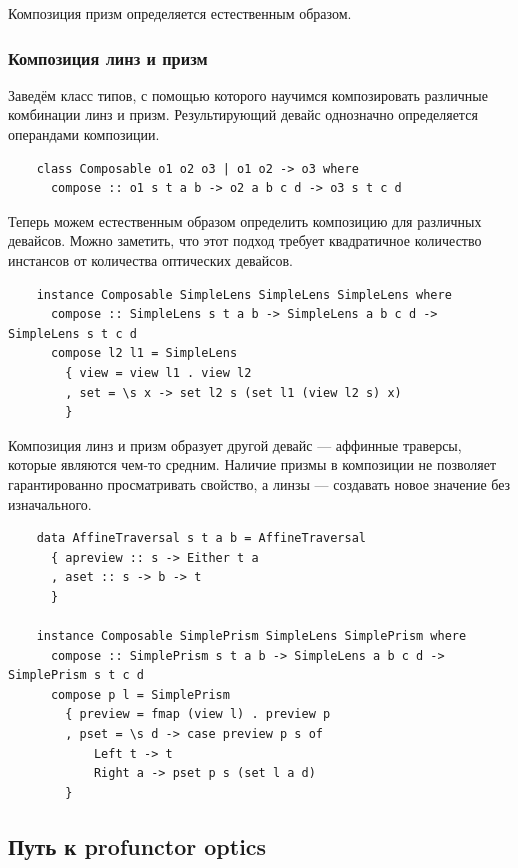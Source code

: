 Композиция призм определяется естественным образом.


\subsubsection{Композиция линз и призм}

Заведём класс типов, с помощью которого научимся композировать различные комбинации линз и призм.
Результирующий девайс однозначно определяется операндами композиции.

\begin{verbatim}
    class Composable o1 o2 o3 | o1 o2 -> o3 where
      compose :: o1 s t a b -> o2 a b c d -> o3 s t c d
\end{verbatim}

Теперь можем естественным образом определить композицию для различных девайсов.
Можно заметить, что этот подход требует квадратичное количество инстансов от количества оптических девайсов.

\begin{verbatim}
    instance Composable SimpleLens SimpleLens SimpleLens where
      compose :: SimpleLens s t a b -> SimpleLens a b c d -> SimpleLens s t c d
      compose l2 l1 = SimpleLens
        { view = view l1 . view l2
        , set = \s x -> set l2 s (set l1 (view l2 s) x)
        }
\end{verbatim}

Композиция линз и призм образует другой девайс --- аффинные траверсы, которые являются чем-то средним.
Наличие призмы в композиции не позволяет гарантированно просматривать свойство, а линзы --- создавать новое значение без изначального.
\begin{verbatim}
    data AffineTraversal s t a b = AffineTraversal
      { apreview :: s -> Either t a
      , aset :: s -> b -> t
      }

    instance Composable SimplePrism SimpleLens SimplePrism where
      compose :: SimplePrism s t a b -> SimpleLens a b c d -> SimplePrism s t c d
      compose p l = SimplePrism
        { preview = fmap (view l) . preview p
        , pset = \s d -> case preview p s of
            Left t -> t
            Right a -> pset p s (set l a d)
        }
\end{verbatim}

\subsection{Путь к profunctor optics}

